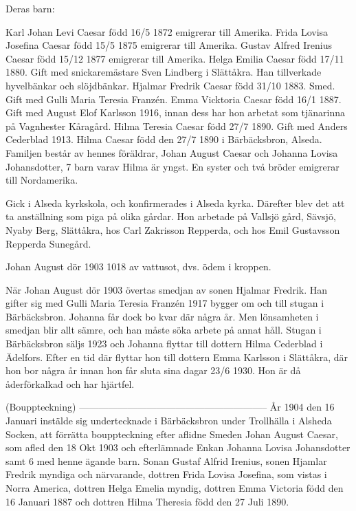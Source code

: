 Deras barn:


Karl Johan Levi Caesar född 16/5 1872 emigrerar till Amerika.
Frida Lovisa Josefina Caesar född 15/5 1875 emigrerar till Amerika.
Gustav Alfred Irenius Caesar född 15/12 1877 emigrerar till Amerika.
Helga Emilia Caesar född 17/11 1880. Gift med snickaremästare Sven Lindberg i Slättåkra. Han tillverkade hyvelbänkar och slöjdbänkar.
Hjalmar Fredrik Caesar född 31/10 1883. Smed. Gift med Gulli Maria Teresia Franzén.
Emma Vicktoria Caesar född 16/1 1887. Gift med August Elof Karlsson 1916, innan dess har hon arbetat som tjänarinna  på Vagnhester Kåragård.
Hilma Teresia Caesar född 27/7 1890. Gift med Anders Cederblad 1913.
Hilma Caesar född den 27/7 1890 i Bärbäcksbron, Alseda. Familjen består av hennes föräldrar, Johan August Caesar och Johanna Lovisa Johansdotter, 7 barn varav Hilma är yngst.
En syster och två bröder emigrerar till Nordamerika.




Gick i Alseda kyrkskola, och konfirmerades i Alseda kyrka.
Därefter blev det att ta anställning som piga på olika gårdar.
Hon arbetade på Vallsjö gård, Sävsjö, Nyaby Berg, Slättåkra, hos Carl Zakrisson Repperda, och hos Emil Gustavsson Repperda Sunegård.




Johan August dör 1903 1018 av vattusot, dvs. ödem i kroppen.


När Johan August dör 1903 övertas smedjan av sonen Hjalmar Fredrik. Han gifter sig med Gulli Maria Teresia Franzén 1917 bygger om och till stugan i Bärbäcksbron. Johanna får dock bo kvar där några år. Men lönsamheten i smedjan blir allt sämre, och han måste söka arbete på annat håll. Stugan i Bärbäcksbron säljs 1923 och Johanna flyttar till dottern Hilma Cederblad i Ädelfors. Efter en tid där flyttar hon till dottern Emma Karlsson i Slättåkra, där hon bor några år innan hon får sluta sina dagar  23/6 1930. Hon är då åderförkalkad och har hjärtfel.




(Bouppteckning)
-----------------------------------------------------------
År 1904 den 16 Januari instälde sig undertecknade i Bärbäcksbron under Trollhälla i Alsheda Socken, att förrätta bouppteckning efter aflidne Smeden Johan August Caesar, som afled den 18 Okt 1903 och efterlämnade Enkan Johanna Lovisa Johansdotter samt 6 med henne ägande barn. Sonan Gustaf Alfrid Irenius, sonen Hjamlar Fredrik myndiga och närvarande, dottren Frida Lovisa Josefina, som vistas i Norra America, dottren Helga Emelia myndig, dottren Emma Victoria född den 16 Januari 1887 och dottren Hilma Theresia född den 27 Juli 1890.


